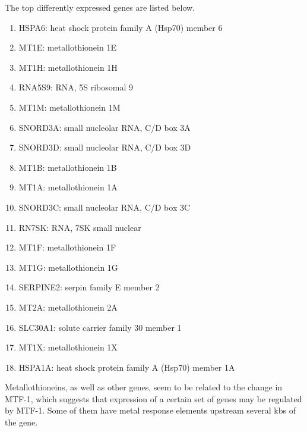 The top differently expressed genes are listed below.

\begin{enumerate}
    \item HSPA6: heat shock protein family A (Hsp70) member 6
    \item MT1E:	metallothionein 1E
    \item MT1H:	metallothionein 1H
    \item RNA5S9:	RNA, 5S ribosomal 9
    \item MT1M:	metallothionein 1M
    \item SNORD3A:	small nucleolar RNA, C/D box 3A
    \item SNORD3D:	small nucleolar RNA, C/D box 3D
    \item MT1B:	metallothionein 1B
    \item MT1A:	metallothionein 1A
    \item SNORD3C:	small nucleolar RNA, C/D box 3C
    \item RN7SK:	RNA, 7SK small nuclear
    \item MT1F:	metallothionein 1F
    \item MT1G:	metallothionein 1G
    \item SERPINE2:	serpin family E member 2
    \item MT2A:	metallothionein 2A
    \item SLC30A1:	solute carrier family 30 member 1
    \item MT1X:	metallothionein 1X
    \item HSPA1A:	heat shock protein family A (Hsp70) member 1A
\end{enumerate}

Metallothioneins, as well as other genes, seem to be related to the change in MTF-1, which suggests that expression of a certain set of genes may be regulated by MTF-1. Some of them have metal response elements upstream several kbs of the gene.